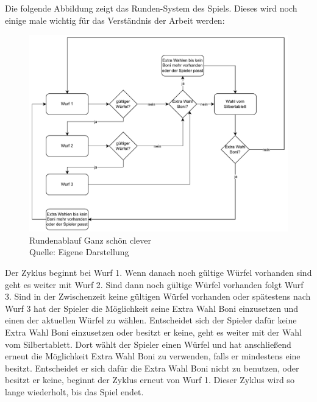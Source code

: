 	Die folgende Abbildung zeigt das Runden-System des Spiels. Dieses wird noch einige male wichtig für das Verständnis der Arbeit werden:
	\nopagebreak
\begin{figure}[h]
	\includegraphics[width=1\textwidth]{Bilder/Rundenablauf.drawio} 
	\caption[Rundenablauf Ganz schön clever]{Rundenablauf Ganz schön clever\\ Quelle: Eigene Darstellung}
\end{figure}

Der Zyklus beginnt bei Wurf 1. Wenn danach noch gültige Würfel vorhanden sind geht es weiter mit Wurf 2. Sind dann noch gültige Würfel vorhanden folgt Wurf 3. Sind in der Zwischenzeit keine gültigen Würfel vorhanden oder spätestens nach Wurf 3 hat der Spieler die Möglichkeit seine Extra Wahl Boni einzusetzen und einen der aktuellen Würfel zu wählen. Entscheidet sich der Spieler dafür keine Extra Wahl Boni einzusetzen oder besitzt er keine, geht es weiter mit der Wahl vom Silbertablett. Dort wählt der Spieler einen Würfel und hat anschließend erneut die Möglichkeit Extra Wahl Boni zu verwenden, falls er mindestens eine besitzt. Entscheidet er sich dafür die Extra Wahl Boni nicht zu benutzen, oder besitzt er keine, beginnt der Zyklus erneut von Wurf 1. Dieser Zyklus wird so lange wiederholt, bis das Spiel endet.\\

